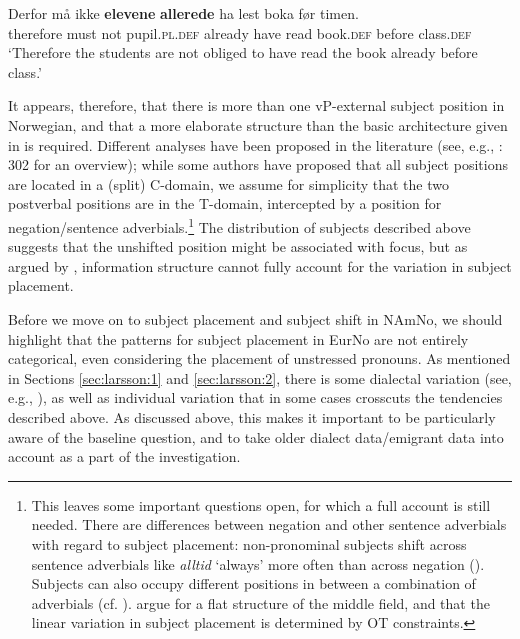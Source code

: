 \documentclass[output=paper]{langscibook}
\begin{document}
\ea \label{ex:larsson:9}
\gll  Derfor må ikke \textbf{elevene} \textbf{allerede} ha lest boka før timen.\\
therefore must not pupil.\textsc{pl.def} already have read book.\textsc{def}     before class.\textsc{def}\\
\glt ‘Therefore the students are not obliged to have read the book already before class.’  
\z

It appears, therefore, that there is more than one vP-external subject position in Norwegian, and that a more elaborate structure than the basic architecture given in  is required. Different analyses have been proposed in the literature (see, e.g., \citealt{Westergaard2011}: 302 for an overview); while some authors have proposed that all subject positions are located in a (split) C-domain, we assume for simplicity that the two postverbal positions are in the T-domain, intercepted by a position for negation/sentence adverbials.\footnote{This leaves some important questions open, for which a full account is still needed. There are differences between negation and other sentence adverbials with regard to subject placement: non-pronominal subjects shift across sentence adverbials like \textit{alltid} ‘always’ more often than across negation (\citealt{LundquistTengesdal2022}). Subjects can also occupy different positions in between a combination of adverbials (cf. ). \citet{BörjarsEtAl2003} argue for a flat structure of the middle field, and that the linear variation in subject placement is determined by OT constraints.}  The distribution of subjects described above suggests that the unshifted position might be associated with focus, but as argued by \citet{LundquistTengesdal2022}, information structure cannot fully account for the variation in subject placement. 

Before we move on to subject placement and subject shift in NAmNo, we should highlight that the patterns for subject placement in EurNo are not entirely categorical, even considering the placement of unstressed pronouns. As mentioned in Sections \ref{sec:larsson:1} and \ref{sec:larsson:2}, there is some dialectal variation (see, e.g., \citealt{OestboeMunch2013, Bentzen2014a}), as well as individual variation that in some cases crosscuts the tendencies described above. As discussed above, this makes it important to be particularly aware of the baseline question, and to take older dialect data/emigrant data into account as a part of the investigation.\largerpage
\end{document}
